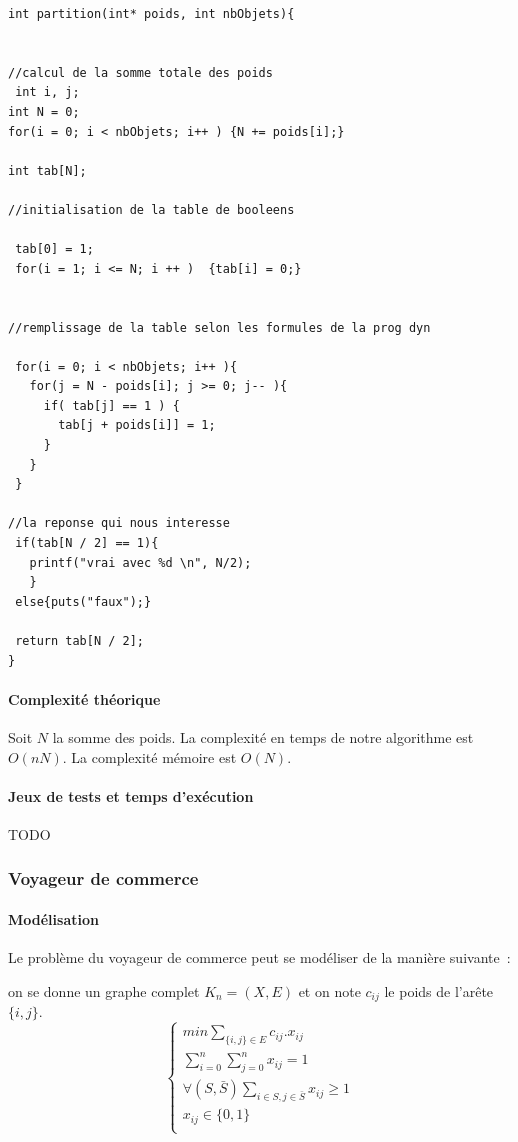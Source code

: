 \documentclass[a4paper, 12pt]{article}
\begin{document}
\begin{lstlisting}
int partition(int* poids, int nbObjets){ 


//calcul de la somme totale des poids
 int i, j;
int N = 0;
for(i = 0; i < nbObjets; i++ ) {N += poids[i];}

int tab[N]; 

//initialisation de la table de booleens

 tab[0] = 1;
 for(i = 1; i <= N; i ++ )  {tab[i] = 0;}


//remplissage de la table selon les formules de la prog dyn

 for(i = 0; i < nbObjets; i++ ){
   for(j = N - poids[i]; j >= 0; j-- ){
     if( tab[j] == 1 ) {
       tab[j + poids[i]] = 1;
     }
   }
 }

//la reponse qui nous interesse
 if(tab[N / 2] == 1){ 
   printf("vrai avec %d \n", N/2);
   }
 else{puts("faux");}

 return tab[N / 2];
}

\end{lstlisting}

\paragraph{Complexité théorique}

Soit $N$ la somme des poids.
La complexité en temps de notre algorithme est $O(nN)$.
La complexité mémoire est $O(N).$

\paragraph{Jeux de tests et temps d'exécution}

TODO

\subsubsection{Voyageur de commerce}

\paragraph{Modélisation}

Le problème du voyageur de commerce peut se modéliser de la manière
suivante~:


on se donne un graphe complet $K_n=(X,E)$ et on note $c_{ij}$ le poids
de l'arête $\{i,j\}$.
\begin{equation}
\begin{cases}
min \sum_{\{i, j\} \in E} c_{ij}.x_{ij} \\
\sum_{i=0}^n \sum_{j=0}^n x_{ij} = 1 \\
\forall (S, \bar{S}) \sum_{i \in S, j \in \bar{S}} x_{ij} \geq 1 \\
x_{ij} \in \{0, 1\} \\
\end{cases}
\end{equation}
\end{document}
